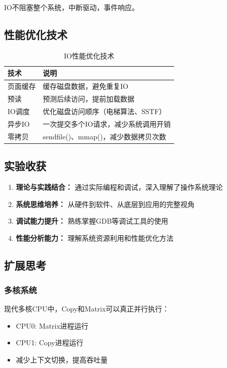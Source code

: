 \documentclass[UTF8,a4paper,12pt]{ctexart}
\begin{document}
IO不阻塞整个系统，中断驱动，事件响应。

\subsection{性能优化技术}

\begin{table}[H]
\centering
\caption{IO性能优化技术}
\begin{tabular}{lp{10cm}}
\toprule
\textbf{技术} & \textbf{说明} \\
\midrule
页面缓存 & 缓存磁盘数据，避免重复IO \\
预读 & 预测后续访问，提前加载数据 \\
IO调度 & 优化磁盘访问顺序（电梯算法、SSTF） \\
异步IO & 一次提交多个IO请求，减少系统调用开销 \\
零拷贝 & sendfile()、mmap()，减少数据拷贝次数 \\
\bottomrule
\end{tabular}
\end{table}

\subsection{实验收获}

\begin{enumerate}[leftmargin=2em]
    \item \textbf{理论与实践结合：} 通过实际编程和调试，深入理解了操作系统理论
    \item \textbf{系统思维培养：} 从硬件到软件、从底层到应用的完整视角
    \item \textbf{调试能力提升：} 熟练掌握GDB等调试工具的使用
    \item \textbf{性能分析能力：} 理解系统资源利用和性能优化方法
\end{enumerate}

\subsection{扩展思考}

\subsubsection{多核系统}

现代多核CPU中，Copy和Matrix可以真正并行执行：
\begin{itemize}
    \item CPU0: Matrix进程运行
    \item CPU1: Copy进程运行
    \item 减少上下文切换，提高吞吐量
\end{itemize}
\end{document}
